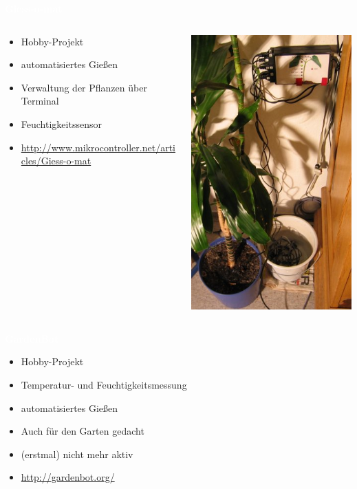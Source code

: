 \documentclass[bigger]{beamer}
\newcommand{\topic}[1]{{\huge{\textcolor{white}{\textbf{#1}}}}}
\begin{document}
\begin{frame}{\topic{Giess-o-mat}}
	\begin{columns}[T]
		\begin{column}{.5\textwidth}
			\begin{itemize}
            \item Hobby-Projekt
				\item automatisiertes Gießen
				\item Verwaltung der Pflanzen über Terminal
				\item Feuchtigkeitssensor
				\item \url{http://www.mikrocontroller.net/articles/Giess-o-mat}
			\end{itemize}
		\end{column}
		\begin{column}{.5\textwidth}
			\includegraphics[width=0.55\linewidth]{Giessomat.jpg}
		\end{column}
	\end{columns}
\end{frame}

\begin{frame}{\topic{GardenBot}}
	\begin{itemize}
      \item Hobby-Projekt
		\item Temperatur- und Feuchtigkeitsmessung
		\item automatisiertes Gießen
		\item Auch für den Garten gedacht
		\item (erstmal) nicht mehr aktiv
		\item \url{http://gardenbot.org/}
	\end{itemize}
\end{frame}
\end{document}

